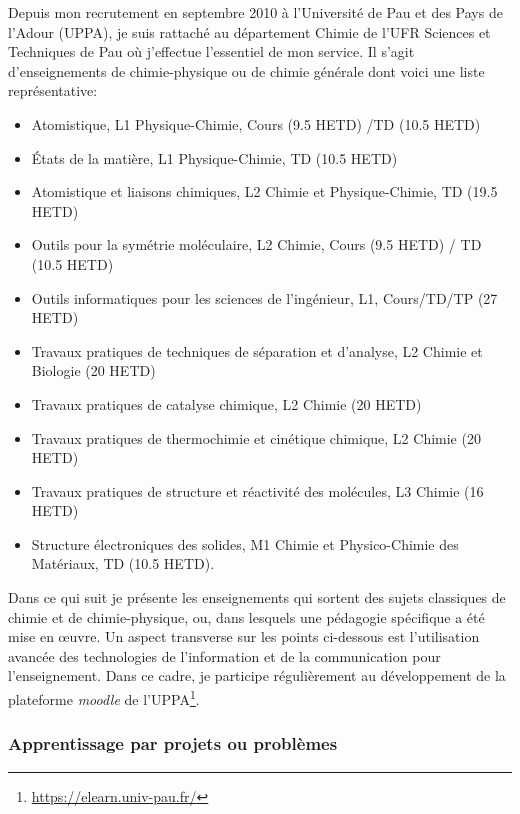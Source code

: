 \documentclass[11pt]{artuppax}
\newcounter{subsec}[section]
\begin{document}
Depuis mon recrutement en septembre 2010 à l'Université de Pau et des Pays de l'Adour (UPPA),
je suis rattaché au département
Chimie de l'UFR Sciences et Techniques de Pau où j'effectue l'essentiel de mon service.
Il s'agit d'enseignements de chimie-physique ou de chimie générale dont voici une
liste représentative:
\begin{itemize}\singlespacing
    \item Atomistique, L1 Physique-Chimie, Cours (9.5 HETD) /TD (10.5 HETD)
    \item États de la matière, L1 Physique-Chimie, TD (10.5 HETD)
    \item Atomistique et liaisons chimiques, L2 Chimie et Physique-Chimie, TD (19.5 HETD)
    \item Outils pour la symétrie moléculaire, L2 Chimie, Cours (9.5 HETD) / TD (10.5 HETD)
    \item Outils informatiques pour les sciences de l'ingénieur, L1, Cours/TD/TP (27 HETD)

    \item Travaux pratiques de techniques de séparation et d'analyse, L2 Chimie et Biologie (20 HETD)
    \item Travaux pratiques de catalyse chimique, L2 Chimie (20 HETD)
    \item Travaux pratiques de thermochimie et cinétique chimique, L2 Chimie (20 HETD)
    \item Travaux pratiques de structure et réactivité des molécules, L3 Chimie (16 HETD)

    \item Structure électroniques des solides, M1 Chimie et Physico-Chimie des Matériaux, TD (10.5 HETD).
\end{itemize}

Dans ce qui suit je présente les enseignements qui sortent des sujets classiques de
chimie et de chimie-physique, ou, dans lesquels une pédagogie spécifique a été mise en
œuvre. Un aspect transverse sur les points ci-dessous est l'utilisation avancée des technologies
de l'information et de la communication pour l'enseignement. Dans ce cadre, je participe
régulièrement au développement de la plateforme \textit{moodle} de l'UPPA\footnote{\url{https://elearn.univ-pau.fr/}}.

\subsubsection{Apprentissage par projets ou problèmes}
\end{document}
